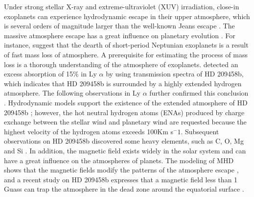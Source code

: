 \documentclass[journal, onecolumn]{aastex631}
\begin{document}
\begin{CJK*}{UTF8}{gbsn}
Under strong stellar X-ray and extreme-ultraviolet (XUV) irradiation, close-in exoplanets can experience hydrodynamic escape in their upper atmosphere, which is several orders of magnitude larger than the well-known Jeans escape \citep{Murray2009}. The massive atmosphere escape has a great influence on planetary evolution \citep{Lecavelier2004}. For instance, \cite{Owen2017} suggest that the dearth of short-period Neptunian exoplanets \citep{Mazeh2016} is a result of fast mass loss of atmosphere. A prerequisite for estimating the process of mass loss is a  thorough understanding of the atmosphere of exoplanets. \cite{Vidal2003} detected an excess absorption of 15\% in Ly $\alpha$ by using transmission spectra of HD 209458b, which indicates that HD 209458b is surrounded by a highly extended hydrogen atmosphere. The following observations in Ly $\alpha$ further confirmed this conclusion \citep{Vidal2008, Ehrenreich2008}. Hydrodynamic models support the existence of the extended atmosphere of HD 209458b \citep{Yelle2004, Garcia2007, Murray2009, Guo2011, Guo2013, Guo2016}; however, the hot neutral hydrogen atoms (ENAs) produced by charge exchange between the stellar wind and planetary wind \citep{Holmstrom2008, Khodachenko2017} are requested because the highest velocity of the hydrogen atoms exceeds 100Km s$^-1$. Subsequent observations on HD 209458b discovered some heavy elements, such as C, O, Mg and Si \citep{Vidal2004, Vidal2013, Ballester2015, Linsky2010}. In addition, the magnetic field exists widely in the solar system and can have a great influence on the atmospheres of planets. The modeling of MHD shows that the magnetic fields modify the patterns of the atmosphere escape \citep{Trammell2014}, and a recent study on HD 209458b expresses that a magnetic field less than 1 Guass can trap the atmosphere in the dead zone around the equatorial surface \citep{Khodachenko2021_0}.



\end{CJK*}
\end{document}
